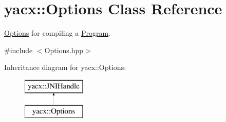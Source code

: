 \hypertarget{classyacx_1_1_options}{}\section{yacx\+:\+:Options Class Reference}
\label{classyacx_1_1_options}


\hyperlink{classyacx_1_1_options}{Options} for compiling a \hyperlink{classyacx_1_1_program}{Program}.  




{\ttfamily \#include $<$Options.\+hpp$>$}

Inheritance diagram for yacx\+:\+:Options\+:\begin{figure}[H]
\begin{center}
\leavevmode
\includegraphics[height=2.000000cm]{classyacx_1_1_options}
\end{center}
\end{figure}
